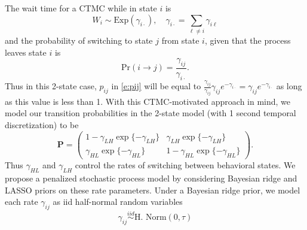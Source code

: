 \documentclass[smallextended]{svjour3}       %
\begin{document}
The wait time for a CTMC while in state $i$ is
\begin{equation}
W_{i} \sim \text{Exp}(\gamma_{i \cdot}), \quad \gamma_{i \cdot} = \sum_{\ell \neq i} \gamma_{i\ell}
\end{equation}
and the probability of switching to state $j$ from state $i$, given that the process leaves state $i$ is
\begin{equation}
 \text{Pr}(i \rightarrow j) = \frac{\gamma_{ij}}{\gamma_{i \cdot }}.
\end{equation}
Thus in this 2-state case, $p_{ij}$ in  \eqref{e:pij} will be equal to $\frac{\gamma_{ij}} {\gamma_{ij}} \gamma_{ij} e^{-\gamma_{i\cdot}} = \gamma_{ij}e^{-\gamma_{i\cdot}}$ as long as this value is less than 1.   
With this CTMC-motivated approach in mind, we model our transition probabilities in the 2-state model (with 1 second temporal discretization) to be
\begin{equation}
\mathbf{P} = \begin{pmatrix}
1- \gamma_{LH}\exp\{- \gamma_{LH} \} & \gamma_{LH}\exp\{- \gamma_{LH} \}\\
\gamma_{HL} \exp\{- \gamma_{HL}\} & 1 - \gamma_{HL} \exp\{- \gamma_{HL}\}
\end{pmatrix}.
\label{e:2statePTM}
\end{equation}
Thus $\gamma_{HL}$ and $\gamma_{LH}$ control the rates of switching between behavioral states. We propose a penalized stochastic process model by considering Bayesian ridge and LASSO priors on these rate parameters. Under a Bayesian ridge prior, we model each rate $\gamma_{ij}$ as iid half-normal random variables
\begin{equation}
\gamma_{ij} \stackrel{iid}{\sim} \text{H. Norm}(0, \tau) 
\end{equation}
\end{document}
